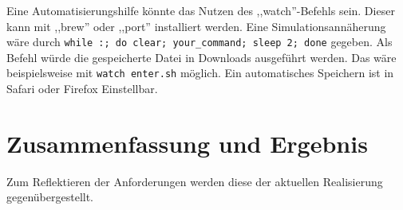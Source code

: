 \documentclass[oneside, ngerman, toc=bibliography,bibliography=totoc,listof=entryprefix, open=right,numbers=noenddot,fontsize=12pt]{scrbook}
\begin{document}
Eine Automatisierungshilfe könnte das Nutzen des ,,watch''-Befehls sein. Dieser kann mit ,,brew'' oder ,,port'' installiert werden. 
Eine Simulationsannäherung wäre durch \verb|while :; do clear; your_command; sleep 2; done| gegeben.
Als Befehl würde die gespeicherte Datei in Downloads ausgeführt werden. Das wäre beispielsweise mit \verb|watch enter.sh| möglich.
Ein automatisches Speichern ist in Safari oder Firefox Einstellbar.


 
 

\section{Zusammenfassung und Ergebnis}
Zum Reflektieren der Anforderungen werden diese der aktuellen Realisierung gegenübergestellt.
\end{document}
